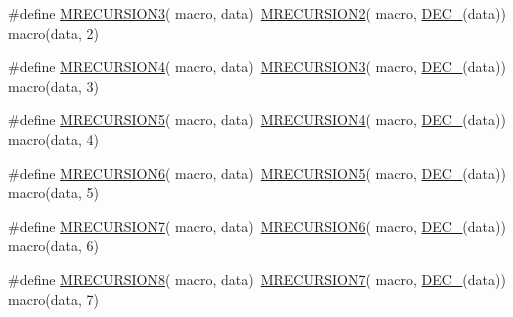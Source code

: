 \begin{DoxyCompactItemize}
\item 
\#define \mbox{\hyperlink{group__group__sam0__utils__mrecursion_ga5a520c697c59955390859baf374dd4e0}{M\+R\+E\+C\+U\+R\+S\+I\+O\+N3}}( macro,  data)~\mbox{\hyperlink{group__group__sam0__utils__mrecursion_gafe783fdf9d0ca650c910ca679e6b65f2}{M\+R\+E\+C\+U\+R\+S\+I\+O\+N2}}(  macro, \mbox{\hyperlink{group__group__sam0__utils__mrecursion_ga1d23d683797679dca8c3512a54a5dcae}{D\+E\+C\+\_\+}}(data))   macro(data, 2)
\item 
\#define \mbox{\hyperlink{group__group__sam0__utils__mrecursion_ga2d656e7a4383e3523b0ec081dd15845d}{M\+R\+E\+C\+U\+R\+S\+I\+O\+N4}}( macro,  data)~\mbox{\hyperlink{group__group__sam0__utils__mrecursion_ga5a520c697c59955390859baf374dd4e0}{M\+R\+E\+C\+U\+R\+S\+I\+O\+N3}}(  macro, \mbox{\hyperlink{group__group__sam0__utils__mrecursion_ga1d23d683797679dca8c3512a54a5dcae}{D\+E\+C\+\_\+}}(data))   macro(data, 3)
\item 
\#define \mbox{\hyperlink{group__group__sam0__utils__mrecursion_ga7faede9937334456ce9d5e2b9fbe1663}{M\+R\+E\+C\+U\+R\+S\+I\+O\+N5}}( macro,  data)~\mbox{\hyperlink{group__group__sam0__utils__mrecursion_ga2d656e7a4383e3523b0ec081dd15845d}{M\+R\+E\+C\+U\+R\+S\+I\+O\+N4}}(  macro, \mbox{\hyperlink{group__group__sam0__utils__mrecursion_ga1d23d683797679dca8c3512a54a5dcae}{D\+E\+C\+\_\+}}(data))   macro(data, 4)
\item 
\#define \mbox{\hyperlink{group__group__sam0__utils__mrecursion_gaf21e043eaf3be7f96acaad10d42798f6}{M\+R\+E\+C\+U\+R\+S\+I\+O\+N6}}( macro,  data)~\mbox{\hyperlink{group__group__sam0__utils__mrecursion_ga7faede9937334456ce9d5e2b9fbe1663}{M\+R\+E\+C\+U\+R\+S\+I\+O\+N5}}(  macro, \mbox{\hyperlink{group__group__sam0__utils__mrecursion_ga1d23d683797679dca8c3512a54a5dcae}{D\+E\+C\+\_\+}}(data))   macro(data, 5)
\item 
\#define \mbox{\hyperlink{group__group__sam0__utils__mrecursion_ga995e80fc9e504c74b860f862ab3cc474}{M\+R\+E\+C\+U\+R\+S\+I\+O\+N7}}( macro,  data)~\mbox{\hyperlink{group__group__sam0__utils__mrecursion_gaf21e043eaf3be7f96acaad10d42798f6}{M\+R\+E\+C\+U\+R\+S\+I\+O\+N6}}(  macro, \mbox{\hyperlink{group__group__sam0__utils__mrecursion_ga1d23d683797679dca8c3512a54a5dcae}{D\+E\+C\+\_\+}}(data))   macro(data, 6)
\item 
\#define \mbox{\hyperlink{group__group__sam0__utils__mrecursion_gacca8590be6aada8914a304fd29258c46}{M\+R\+E\+C\+U\+R\+S\+I\+O\+N8}}( macro,  data)~\mbox{\hyperlink{group__group__sam0__utils__mrecursion_ga995e80fc9e504c74b860f862ab3cc474}{M\+R\+E\+C\+U\+R\+S\+I\+O\+N7}}(  macro, \mbox{\hyperlink{group__group__sam0__utils__mrecursion_ga1d23d683797679dca8c3512a54a5dcae}{D\+E\+C\+\_\+}}(data))   macro(data, 7)

\end{DoxyCompactItemize}
